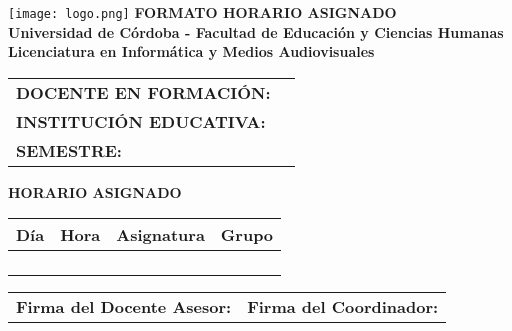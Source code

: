 \documentclass[a4paper,12pt]{article}
\begin{document}
\begin{center}
    \vspace*{1cm}
    \texttt{[image: logo.png]} %
    \vspace{0.5cm}
    \textbf{\Large FORMATO HORARIO ASIGNADO} \\
    \vspace{0.5cm}
    \textbf{Universidad de Córdoba - Facultad de Educación y Ciencias Humanas} \\
    \textbf{Licenciatura en Informática y Medios Audiovisuales}
\end{center}

\vspace{0.5cm}
\begin{tabularx}{\textwidth}{@{}p{5cm}X@{}}
    \toprule
    \textbf{DOCENTE EN FORMACIÓN:} & \hrulefill \\
    \textbf{INSTITUCIÓN EDUCATIVA:} & \hrulefill \\
    \textbf{SEMESTRE:} & \hrulefill \\
    \bottomrule
\end{tabularx}

\vspace{0.5cm}
\noindent
\textbf{HORARIO ASIGNADO}
\begin{table}[h]
    \centering
    \scriptsize
    \begin{tabularx}{\textwidth}{|c|X|X|X|}
        \hline
        \textbf{Día} & \textbf{Hora} & \textbf{Asignatura} & \textbf{Grupo} \\
        \hline
        & & & \\ \hline
        & & & \\ \hline
        & & & \\ \hline
        & & & \\ \hline
    \end{tabularx}
\end{table}

\vspace{0.5cm}
\begin{center}
    \begin{tabular}{p{7cm}p{7cm}}
        \hline
        \textbf{Firma del Docente Asesor:} \hrulefill & \textbf{Firma del Coordinador:} \hrulefill \\
    \end{tabular}
\end{center}
\end{document}
